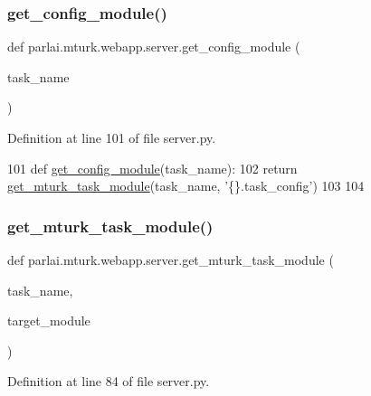 \subsubsection{\texorpdfstring{get\+\_\+config\+\_\+module()}{get\_config\_module()}}
{\footnotesize\ttfamily def parlai.\+mturk.\+webapp.\+server.\+get\+\_\+config\+\_\+module (\begin{DoxyParamCaption}\item[{}]{task\+\_\+name }\end{DoxyParamCaption})}



Definition at line 101 of file server.\+py.


\begin{DoxyCode}
101 \textcolor{keyword}{def }\hyperlink{namespaceparlai_1_1mturk_1_1webapp_1_1server_aee065cfdb6346d4815762ae793427f1e}{get\_config\_module}(task\_name):
102     \textcolor{keywordflow}{return} \hyperlink{namespaceparlai_1_1mturk_1_1webapp_1_1server_a0c7e088cb9401f94297c2ae96dce3ec2}{get\_mturk\_task\_module}(task\_name, \textcolor{stringliteral}{'\{\}.task\_config'})
103 
104 
\end{DoxyCode}
\mbox{\label{namespaceparlai_1_1mturk_1_1webapp_1_1server_a0c7e088cb9401f94297c2ae96dce3ec2}} 
\subsubsection{\texorpdfstring{get\+\_\+mturk\+\_\+task\+\_\+module()}{get\_mturk\_task\_module()}}
{\footnotesize\ttfamily def parlai.\+mturk.\+webapp.\+server.\+get\+\_\+mturk\+\_\+task\+\_\+module (\begin{DoxyParamCaption}\item[{}]{task\+\_\+name,  }\item[{}]{target\+\_\+module }\end{DoxyParamCaption})}



Definition at line 84 of file server.\+py.


